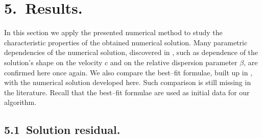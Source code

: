 \documentclass{article}
\begin{document}
\section{5.~Results.}\label{results}

In this section we apply the presented  numerical method  to study the characteristic properties of the obtained numerical solution.  Many parametric dependencies of the numerical solution,  discovered in \cite{Ch2012,Ch2011}, such as dependence of the solution's shape on the velocity $c$ and on the relative dispersion parameter $\beta$, are confirmed here once again.
 We   also compare  the best--fit  formulae,  built up in \cite{Ch2011}, with the numerical solution  developed here. Such comparison is still missing in the literature.
Recall that the best--fit formulae   are used as initial data for our algorithm. 

\subsection{5.1~Solution residual.}
\end{document}
